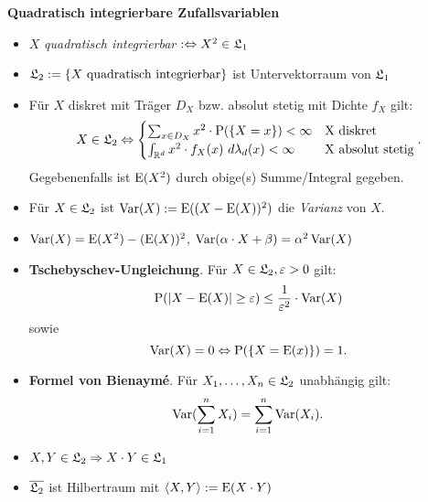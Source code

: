 \textbf{Quadratisch integrierbare Zufallsvariablen}
\begin{itemize}
\item $X$ \textit{quadratisch integrierbar} $:\Leftrightarrow X^2\in\mathfrak{L}_1$

\item $\mathfrak{L}_2:=\{X \text{ quadratisch integrierbar}\}$ ist Untervektorraum von $\mathfrak{L}_1$

\item Für $X$ diskret mit Träger $D_X$ bzw. absolut stetig mit Dichte $f_X$ gilt:
\[
	X\in\mathfrak{L}_2\Leftrightarrow
	\begin{cases}
	\sum_{x\in D_X} x^2\cdot\operatorname{P}(\{X=x\})<\infty			& \text{X diskret} \\
	\int_{\mathbb{R}^d} x^2\cdot f_X(x)~d\lambda_d(x)<\infty		& \text{X absolut stetig}
	\end{cases}.
\]
Gegebenenfalls ist $\operatorname{E}(X^2)$ durch obige(s) Summe/Integral gegeben.

\item Für $X\in\mathfrak{L}_2$ ist $\operatorname{Var}(X):=\operatorname{E}((X-\operatorname{E}(X))^2)$ die \textit{Varianz} von $X$.

\item $\operatorname{Var}(X)=\operatorname{E}(X^2)-(\operatorname{E}(X))^2$, \quad $\operatorname{Var}(\alpha\cdot X+\beta)=\alpha^2\operatorname{Var}(X)$

\item \textbf{Tschebyschev-Ungleichung}. Für $X\in\mathfrak{L}_2, \varepsilon>0$ gilt:
\[
	\operatorname{P}(|X-\operatorname{E}(X)|\geq \varepsilon)\leq \frac{1}{\varepsilon^2}\cdot\operatorname{Var}(X)
\]
sowie
\[
	\operatorname{Var}(X)=0 \Leftrightarrow \operatorname{P}(\{X=\operatorname{E}(x)\})=1.
\]

\item \textbf{Formel von Bienaymé}. Für $X_1,\ldots,X_n\in\mathfrak{L}_2$ unabhängig gilt:
\[
	\operatorname{Var}(\sum_{i=1}^n X_i) = \sum_{i=1}^n\operatorname{Var}(X_i).
\]

\item $X,Y\in\mathfrak{L}_2\Rightarrow X\cdot Y\in\mathfrak{L}_1$

\item $\overline{\mathfrak{L}_2}$ ist Hilbertraum mit $\langle X,Y\rangle :=\operatorname{E}(X\cdot Y)$
\end{itemize}
\hspace{3em}

